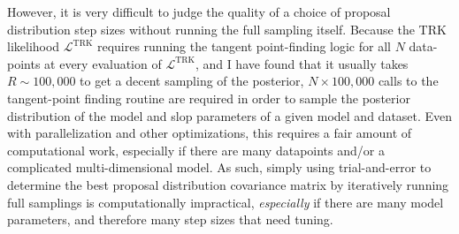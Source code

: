 However, it is very difficult to judge the quality of a choice of proposal distribution step sizes without running the full sampling itself. Because the TRK likelihood $\mathcal{L}^\text{TRK}$ requires running the tangent point-finding logic for all $N$ data-points at every evaluation of $\mathcal{L}^\text{TRK}$, and I have found that it usually takes $R\sim 100,000$ to get a decent sampling of the posterior, $N\times 100,000$ calls to the tangent-point finding routine are required in order to sample the posterior distribution of the model and slop parameters of a given model and dataset. Even with parallelization and other optimizations, this requires a fair amount of computational work, especially if there are many datapoints and/or a complicated multi-dimensional model. As such, simply using trial-and-error to determine the best proposal distribution covariance matrix by iteratively running full samplings is computationally impractical, \textit{especially} if there are many model parameters, and therefore many step sizes that need tuning.

